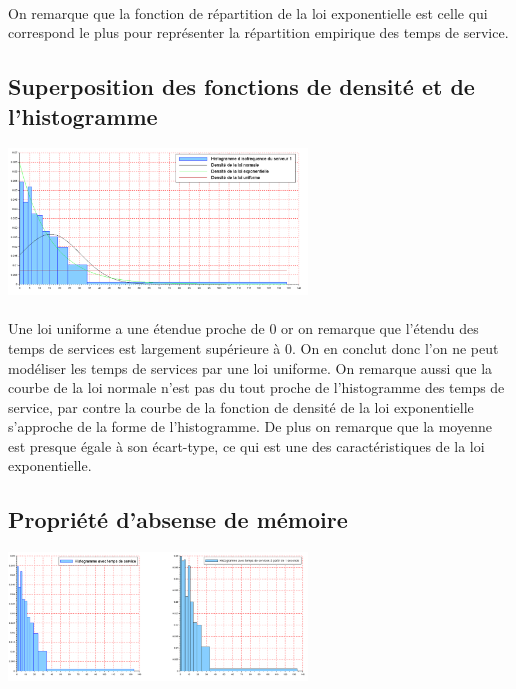 \documentclass{article}
\begin{document}
\paragraph{}
On remarque que la fonction de répartition de la loi exponentielle est celle qui correspond le plus pour représenter la répartition empirique des temps de service.

\subsection{Superposition des fonctions de densité et de l'histogramme}
\begin{center}
\includegraphics[width=300px]{img/S1_densite.png}
\end{center}
\paragraph{}
Une loi uniforme a une étendue proche de 0 or on remarque que l’étendu des temps de services est largement supérieure à 0. On en conclut donc l’on ne peut modéliser les temps de services par une loi uniforme. On remarque aussi que la courbe de la loi normale n’est pas du tout proche de l’histogramme des temps de service, par contre la courbe de la fonction de densité de la loi exponentielle s’approche de la forme de l’histogramme. De plus on remarque que la moyenne est presque égale à son écart-type, ce qui est une des caractéristiques de la loi exponentielle.

\subsection{Propriété d'absense de mémoire}
\begin{center}
\includegraphics[width=300px]{img/S1_mem.png}
\end{center}
\end{document}
